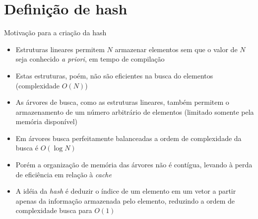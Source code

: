 \section{Definição de hash}

\begin{frame}[fragile]{Motivação para a criação da {hash}}

	\begin{itemize}
		\item Estruturas lineares permitem $N$ armazenar elementos sem que o valor de $N$
		seja conhecido \textit{a priori}, em tempo de compilação

        \item Estas estruturas, poém, não são eficientes na busca do elementos (complexidade $O(N)$)

        \item As árvores de busca, como as estruturas lineares, também permitem o armazenamento 
            de um número arbitrário de elementos (limitado somente pela memória disponível)

		\item Em árvores busca perfeitamente balanceadas a ordem de complexidade da busca 
		    é $O(\log N)$

        \item Porém a organização de memória das árvores não é contígua, levando à perda de
            eficiência em relação à \textit{cache}
 
		\item A idéia da \textit{hash} é deduzir o índice de um elemento em um vetor a partir 
            apenas da informação armazenada pelo elemento, reduzindo a ordem de complexidade busca 
            para $O(1)$
	\end{itemize}

\end{frame}

